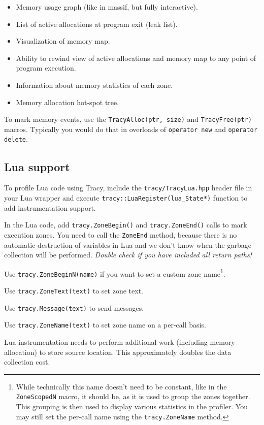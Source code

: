 \documentclass[hidelinks,titlepage,a4paper]{article}
\begin{document}
\begin{itemize}
\item Memory usage graph (like in massif, but fully interactive).
\item List of active allocations at program exit (leak list).
\item Visualization of memory map.
\item Ability to rewind view of active allocations and memory map to any point of program execution.
\item Information about memory statistics of each zone.
\item Memory allocation hot-spot tree.
\end{itemize}

To mark memory events, use the \texttt{TracyAlloc(ptr, size)} and \texttt{TracyFree(ptr)} macros. Typically you would do that in overloads of \texttt{operator new} and \texttt{operator delete}.

\subsection{Lua support}

To profile Lua code using Tracy, include the \texttt{tracy/TracyLua.hpp} header file in your Lua wrapper and execute \texttt{tracy::LuaRegister(lua\_State*)} function to add instrumentation support.

In the Lua code, add \texttt{tracy.ZoneBegin()} and \texttt{tracy.ZoneEnd()} calls to mark execution zones. You need to call the \texttt{ZoneEnd} method, because there is no automatic destruction of variables in Lua and we don't know when the garbage collection will be performed. \emph{Double check if you have included all return paths!}

Use \texttt{tracy.ZoneBeginN(name)} if you want to set a custom zone name\footnote{While technically this name doesn't need to be constant, like in the \texttt{ZoneScopedN} macro, it should be, as it is used to group the zones together. This grouping is then used to display various statistics in the profiler. You may still set the per-call name using the \texttt{tracy.ZoneName} method.}.

Use \texttt{tracy.ZoneText(text)} to set zone text.

Use \texttt{tracy.Message(text)} to send messages.

Use \texttt{tracy.ZoneName(text)} to set zone name on a per-call basis.

Lua instrumentation needs to perform additional work (including memory allocation) to store source location. This approximately doubles the data collection cost.
\end{document}
